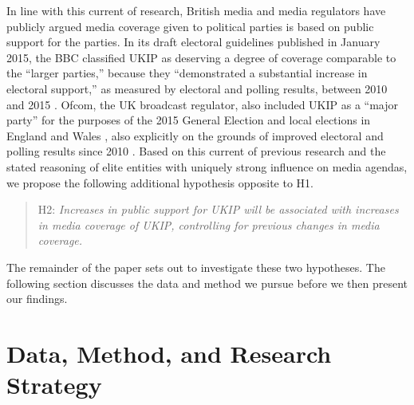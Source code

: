 \documentclass[12pt,]{article}
\begin{document}
In line with this current of research, British media and media
regulators have publicly argued media coverage given to political
parties is based on public support for the parties. In its draft
electoral guidelines published in January 2015, the BBC classified UKIP
as deserving a degree of coverage comparable to the ``larger parties,''
because they ``demonstrated a substantial increase in electoral
support,'' as measured by electoral and polling results, between 2010
and 2015 \citep{Sweeney:wp, BBC:R6UMvIKM}. Ofcom, the UK broadcast
regulator, also included UKIP as a ``major party'' for the purposes of
the 2015 General Election and local elections in England and Wales
\citep{Ofcom:2015tt}, also explicitly on the grounds of improved
electoral and polling results since 2010 \citep{Wintour:vf}. Based on
this current of previous research and the stated reasoning of elite
entities with uniquely strong influence on media agendas, we propose the
following additional hypothesis opposite to H1.

\begin{quote}
H2: \emph{Increases in public support for UKIP will be associated with
increases in media coverage of UKIP, controlling for previous changes in
media coverage.}
\end{quote}

The remainder of the paper sets out to investigate these two hypotheses.
The following section discusses the data and method we pursue before we
then present our findings.

\section{Data, Method, and Research
Strategy}\label{data-method-and-research-strategy}
\end{document}
